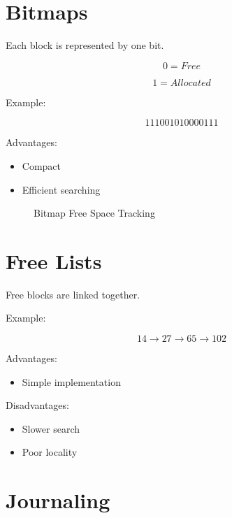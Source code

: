 \section{Bitmaps}

Each block is represented by one bit.

\[
0 = Free
\]

\[
1 = Allocated
\]

Example:

\[
111001010000111
\]

Advantages:

\begin{itemize}
\item Compact
\item Efficient searching
\end{itemize}

\begin{figure}[H]
\centering
{}
\caption{Bitmap Free Space Tracking}
\end{figure}

\section{Free Lists}

Free blocks are linked together.

Example:

\[
14 \rightarrow 27 \rightarrow 65 \rightarrow 102
\]

Advantages:

\begin{itemize}
\item Simple implementation
\end{itemize}

Disadvantages:

\begin{itemize}
\item Slower search
\item Poor locality
\end{itemize}

\section{Journaling}

